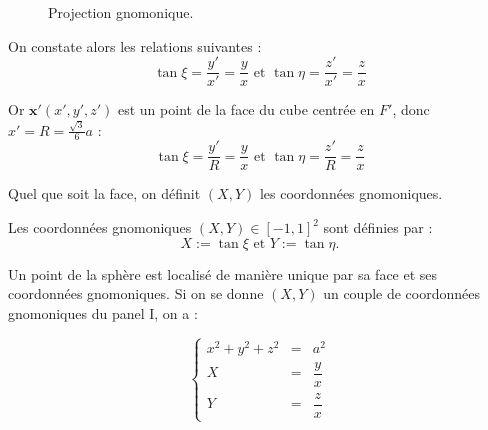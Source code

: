 \begin{figure}[htbp]
\begin{center}
\end{center}
\caption{Projection gnomonique.}
\label{fig: projection gnomonique}
\end{figure}  

On constate alors les relations suivantes :
\begin{equation}
\tan \xi = \dfrac{y'}{x'} = \dfrac{y}{x} \text{ et } \tan \eta = \dfrac{z'}{x'} = \dfrac{z}{x}
\end{equation}

Or $\mathbf{x}'(x',y',z')$ est un point de la face du cube centrée en $F'$, donc $x'=R=\frac{\sqrt{3}}{6}a$ :
\begin{equation}
\tan \xi = \dfrac{y'}{R} = \dfrac{y}{x} \text{ et } \tan \eta = \dfrac{z'}{R} = \dfrac{z}{x}
\end{equation}

Quel que soit la face, on définit $(X,Y)$ les coordonnées gnomoniques.

\begin{definition}
Les coordonnées gnomoniques $(X,Y) \in [-1,1]^2$ sont définies par :
\begin{equation}
X:=\tan \xi \text{ et } Y:= \tan \eta.
\end{equation}
\end{definition}

Un point de la sphère est localisé de manière unique par sa face et ses coordonnées gnomoniques. Si on se donne $(X,Y)$ un couple de coordonnées gnomoniques du panel I, on a :

\begin{equation}
\left\lbrace
\begin{array}{rcl}
x^2+y^2+z^2 & = & a^2\\
X & = & \dfrac{y}{x} \\
Y & = & \dfrac{z}{x}
\end{array}
\right.
\end{equation}

